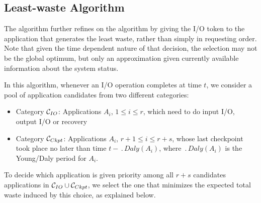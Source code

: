 

\subsection{Least-waste Algorithm}

The \leastwaste algorithm further refines on the \fifononblock algorithm
by giving the I/O token to the application that generates the least
waste, rather than simply in requesting order. Note that given the time
dependent nature of that decision, the selection may
not be the global optimum, but only an approximation given currently
available information about the system status.

In this algorithm, whenever an I/O operation completes at time $t$,
we consider a pool of application candidates from two different categories:

\begin{itemize}
 \item Category \IOcat $\mathcal{C}_{IO}$: Applications $A_{i}$, $1\leq i \leq r$, which
 need to do input I/O, output I/O or recovery
 \item Category \Ckptcat $\mathcal{C}_{Ckpt}$: Applications $A_{i}$, $r+1\leq i \leq r+s$,
 whose last checkpoint took place no later than time $t - \period{Daly}(A_{i})$, where
 $\period{Daly}(A_{i})$ is the Young/Daly period for $A_{i}$.
\end{itemize}

To decide which application is given priority among all $r+s$ candidates
applications in $\mathcal{C}_{IO} \cup \mathcal{C}_{Ckpt}$, we select the one that
minimizes the expected total waste induced by this choice, as explained below.

